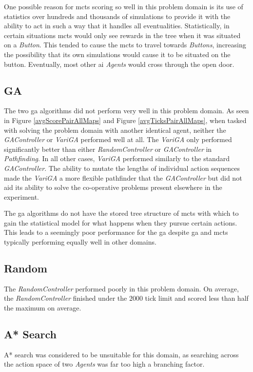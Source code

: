 \documentclass{IEEEtran}
\begin{document}
One possible reason for \gls{mcts} scoring so well in this problem domain is its use of statistics over hundreds and thousands of simulations to provide it with the ability to act in such a way that it handles all eventualities. Statistically,  in certain situations \gls{mcts} would only see rewards in the tree when it was situated on a \emph{Button}. This tended to cause the \gls{mcts} to travel towards \emph{Buttons}, increasing the possibility that its own simulations would cause it to be situated on the button. Eventually, most other \gls{ai} \emph{Agents} would cross through the open door.

\subsection{GA}
The two \gls{ga} algorithms did not perform very well in this problem domain. As seen in Figure \ref{avgScorePairAllMaps} and Figure \ref{avgTicksPairAllMaps}, when tasked with solving the problem domain with another identical agent, neither the \emph{GAController} or \emph{VariGA} performed well at all. The \emph{VariGA} only performed significantly better than either \emph{RandomController} or \emph{GAController} in \emph{Pathfinding}. In all other cases, \emph{VariGA} performed similarly to the standard \emph{GAController}. The ability to mutate the lengths of individual action sequences made the \emph{VariGA} a more flexible pathfinder that the \emph{GAController} but did not aid its ability to solve the co-operative problems present elsewhere in the experiment.

The \gls{ga} algorithms do not have the stored tree structure of \gls{mcts} with which to gain the statistical model for what happens when they pursue certain actions. This leads to a seemingly poor performance for the \gls{ga} despite \gls{ga} and \gls{mcts} typically performing equally well in other domains.
\subsection{Random}
The \emph{RandomController} performed poorly in this problem domain. On average, the \emph{RandomController} finished under the $2000$ tick limit and scored less than half the maximum on average.

\subsection{A* Search}
A* search was considered to be unsuitable for this domain, as searching across the action space of two \emph{Agents} was far too high a branching factor. 
\end{document}
